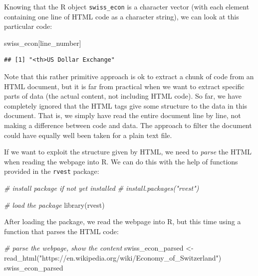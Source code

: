 \documentclass[
  12pt,
]{style/krantz}
\newenvironment{Shaded}{\begin{snugshade}}{\end{snugshade}}
\newcommand{\CommentTok}[1]{\textcolor[rgb]{0.56,0.35,0.01}{\textit{#1}}}
\newcommand{\FunctionTok}[1]{\textcolor[rgb]{0.00,0.00,0.00}{#1}}
\newcommand{\NormalTok}[1]{#1}
\newcommand{\OtherTok}[1]{\textcolor[rgb]{0.56,0.35,0.01}{#1}}
\newcommand{\StringTok}[1]{\textcolor[rgb]{0.31,0.60,0.02}{#1}}
\begin{document}
Knowing that the R object \texttt{swiss\_econ} is a character vector (with each element containing one line of HTML code as a character string), we can look at this particular code:

\begin{Shaded}
\begin{Highlighting}[]
\NormalTok{swiss\_econ[line\_number]}
\end{Highlighting}
\end{Shaded}

\begin{verbatim}
## [1] "<th>US Dollar Exchange"
\end{verbatim}

Note that this rather primitive approach is ok to extract a chunk of code from an HTML document, but it is far from practical when we want to extract specific parts of data (the actual content, not including HTML code). So far, we have completely ignored that the HTML tags give some structure to the data in this document. That is, we simply have read the entire document line by line, not making a difference between code and data. The approach to filter the document could have equally well been taken for a plain text file.

If we want to exploit the structure given by HTML, we need to \emph{parse} the HTML when reading the webpage into R. We can do this with the help of functions provided in the \texttt{rvest} package:

\begin{Shaded}
\begin{Highlighting}[]
\CommentTok{\# install package if not yet installed}
\CommentTok{\# install.packages("rvest")}

\CommentTok{\# load the package}
\FunctionTok{library}\NormalTok{(rvest)}
\end{Highlighting}
\end{Shaded}

After loading the package, we read the webpage into R, but this time using a function that parses the HTML code:

\begin{Shaded}
\begin{Highlighting}[]
\CommentTok{\# parse the webpage, show the content}
\NormalTok{swiss\_econ\_parsed }\OtherTok{\textless{}{-}} \FunctionTok{read\_html}\NormalTok{(}\StringTok{"https://en.wikipedia.org/wiki/Economy\_of\_Switzerland"}\NormalTok{)}
\NormalTok{swiss\_econ\_parsed}
\end{Highlighting}
\end{Shaded}
\end{document}
